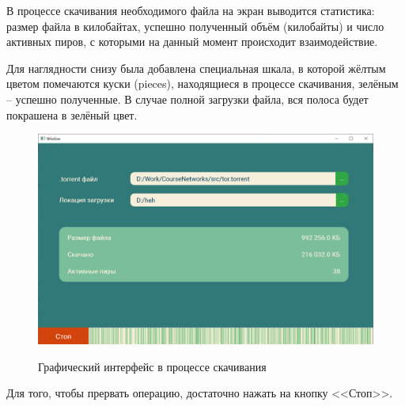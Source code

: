 В процессе скачивания необходимого файла на экран выводится статистика: размер файла в килобайтах, успешно полученный объём (килобайты) и число активных пиров, с которыми на данный момент происходит взаимодействие.

Для наглядности снизу была добавлена специальная шкала, в которой жёлтым цветом помечаются куски (pieces), находящиеся в процессе скачивания, зелёным -- успешно полученные. В случае полной загрузки файла, вся полоса будет покрашена в зелёный цвет. \\

\begin{figure}[h]
	\begin{center}
		{\includegraphics[scale = 0.57]{img/interface_ongoing.png}}
		\caption{Графический интерфейс в процессе скачивания}
		\label{fig303:image}
	\end{center}
\end{figure}

Для того, чтобы прервать операцию, достаточно нажать на кнопку <<Стоп>>.